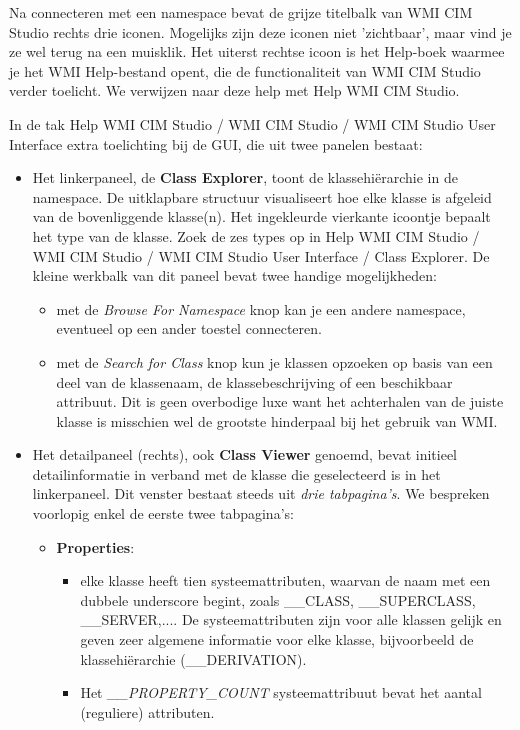 \documentclass[11pt,a4paper]{report}
\begin{document}
Na connecteren met een namespace bevat de grijze titelbalk van WMI CIM Studio rechts drie iconen. Mogelijks zijn deze iconen niet 'zichtbaar', maar vind je ze wel terug na een muisklik. Het uiterst rechtse icoon is het Help-boek waarmee je het WMI Help-bestand opent, die de functionaliteit van WMI CIM Studio verder toelicht. We verwijzen naar deze help met Help WMI CIM Studio. 
\par In de tak Help WMI CIM Studio / WMI CIM Studio / WMI CIM Studio User Interface extra toelichting bij de GUI, die uit twee panelen bestaat:
\begin{itemize}
	\item Het linkerpaneel, de \textbf{Class Explorer}, toont de klassehiërarchie in de namespace. De uitklapbare structuur visualiseert hoe elke klasse is afgeleid van de bovenliggende klasse(n). Het ingekleurde vierkante icoontje bepaalt het type van de klasse. Zoek de zes types op in Help WMI CIM Studio / WMI CIM Studio / WMI CIM Studio User Interface / Class Explorer. De kleine werkbalk van dit paneel bevat twee handige mogelijkheden:
	\begin{itemize}
		\item met de \textit{Browse For Namespace} knop kan je een andere namespace, eventueel op een ander toestel connecteren.
		\item met de\textit{ Search for Class} knop kun je klassen opzoeken op basis van een deel van de klassenaam, de klassebeschrijving of een beschikbaar attribuut. Dit is geen overbodige luxe want het achterhalen van de juiste klasse is misschien wel de grootste hinderpaal bij het gebruik van WMI.
	\end{itemize}
	\item Het detailpaneel (rechts), ook \textbf{Class Viewer} genoemd, bevat initieel detailinformatie in verband met de klasse die geselecteerd is in het linkerpaneel. Dit venster bestaat steeds uit \textit{drie tabpagina's}.
	We bespreken voorlopig enkel de eerste twee tabpagina's:
	\begin{itemize}
		\item \textbf{Properties}:
		\begin{itemize}
			\item elke klasse heeft tien systeemattributen, waarvan de naam met een dubbele underscore begint, zoals \_\_CLASS, \_\_SUPERCLASS, \_\_SERVER,.... De systeemattributen zijn voor alle klassen gelijk en geven zeer algemene informatie voor elke klasse, bijvoorbeeld de klassehiërarchie (\_\_DERIVATION).
			\item Het \textit{\_\_PROPERTY\_COUNT} systeemattribuut bevat het aantal (reguliere) attributen.

\end{itemize}
\end{itemize}
\end{itemize}
\end{document}
